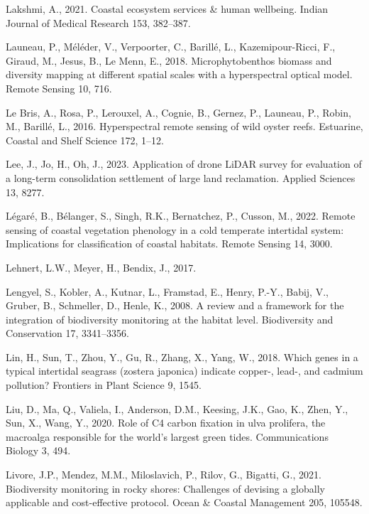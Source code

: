 \documentclass[
  letterpaper,
  11pt,
  english,
  singlespacing,
  headsepline]{MastersDoctoralThesis}
\newlength{\cslhangindent}
\newenvironment{CSLReferences}[2] %
 {\begin{list}{}{%
  \setlength{\itemindent}{0pt}
  \setlength{\leftmargin}{0pt}
  \setlength{\parsep}{0pt}
  \ifodd #1
   \setlength{\leftmargin}{\cslhangindent}
   \setlength{\itemindent}{-1\cslhangindent}
  \fi
  \setlength{\itemsep}{#2\baselineskip}}}
 {\end{list}}
\begin{document}
\begin{CSLReferences}{1}{0}
Lakshmi, A., 2021. Coastal ecosystem services \& human wellbeing. Indian
Journal of Medical Research 153, 382--387.

Launeau, P., Méléder, V., Verpoorter, C., Barillé, L., Kazemipour-Ricci,
F., Giraud, M., Jesus, B., Le Menn, E., 2018. Microphytobenthos biomass
and diversity mapping at different spatial scales with a hyperspectral
optical model. Remote Sensing 10, 716.

Le Bris, A., Rosa, P., Lerouxel, A., Cognie, B., Gernez, P., Launeau,
P., Robin, M., Barillé, L., 2016. Hyperspectral remote sensing of wild
oyster reefs. Estuarine, Coastal and Shelf Science 172, 1--12.

Lee, J., Jo, H., Oh, J., 2023. Application of drone LiDAR survey for
evaluation of a long-term consolidation settlement of large land
reclamation. Applied Sciences 13, 8277.

Légaré, B., Bélanger, S., Singh, R.K., Bernatchez, P., Cusson, M., 2022.
Remote sensing of coastal vegetation phenology in a cold temperate
intertidal system: Implications for classification of coastal habitats.
Remote Sensing 14, 3000.

Lehnert, L.W., Meyer, H., Bendix, J., 2017.

Lengyel, S., Kobler, A., Kutnar, L., Framstad, E., Henry, P.-Y., Babij,
V., Gruber, B., Schmeller, D., Henle, K., 2008. A review and a framework
for the integration of biodiversity monitoring at the habitat level.
Biodiversity and Conservation 17, 3341--3356.

Lin, H., Sun, T., Zhou, Y., Gu, R., Zhang, X., Yang, W., 2018. Which
genes in a typical intertidal seagrass (zostera japonica) indicate
copper-, lead-, and cadmium pollution? Frontiers in Plant Science 9,
1545.

Liu, D., Ma, Q., Valiela, I., Anderson, D.M., Keesing, J.K., Gao, K.,
Zhen, Y., Sun, X., Wang, Y., 2020. Role of C4 carbon fixation in ulva
prolifera, the macroalga responsible for the world's largest green
tides. Communications Biology 3, 494.

Livore, J.P., Mendez, M.M., Miloslavich, P., Rilov, G., Bigatti, G.,
2021. Biodiversity monitoring in rocky shores: Challenges of devising a
globally applicable and cost-effective protocol. Ocean \& Coastal
Management 205, 105548.


\end{CSLReferences}
\end{document}
